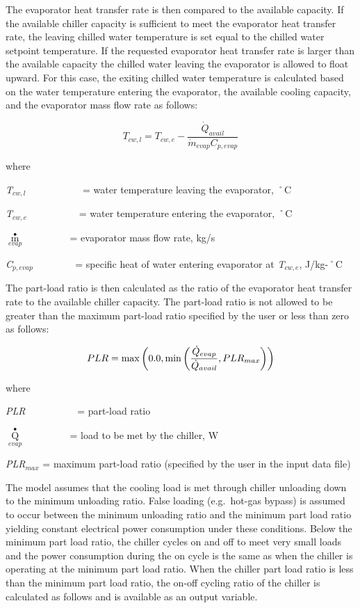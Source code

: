 The evaporator heat transfer rate is then compared to the available capacity. If the available chiller capacity is sufficient to meet the evaporator heat transfer rate, the leaving chilled water temperature is set equal to the chilled water setpoint temperature. If the requested evaporator heat transfer rate is larger than the available capacity the chilled water leaving the evaporator is allowed to float upward. For this case, the exiting chilled water temperature is calculated based on the water temperature entering the evaporator, the available cooling capacity, and the evaporator mass flow rate as follows:

\begin{equation}
  T_{cw,l} = T_{cw,e} - \frac{\dot{Q}_{avail}}{\dot{m}_{evap}C_{p,evap}}
\end{equation}

where

\emph{T\(_{cw,l}\)}~~~~~~~~~~~ = water temperature leaving the evaporator, ˚C

\emph{T\(_{cw,e}\)}~~~~~~~~~~ = water temperature entering the evaporator, ˚C

\({\mathop m\limits^ \bullet_{evap}}\) ~~~~~~~~ = evaporator mass flow rate, kg/s

\emph{C\(_{p,evap}\)}~~~~~~~~ = specific heat of water entering evaporator at \emph{T\(_{cw,e}\)}, J/kg-˚C

The part-load ratio is then calculated as the ratio of the evaporator heat transfer rate to the available chiller capacity. The part-load ratio is not allowed to be greater than the maximum part-load ratio specified by the user or less than zero as follows:

\begin{equation}
  PLR = \max\left(0.0,\min\left(\frac{\dot{Q}_{evap}}{\dot{Q}_{avail}},PLR_{max}\right)\right)
\end{equation}

where

\emph{PLR}~~~~~~~~~~ = part-load ratio

\({\mathop Q\limits^ \bullet_{evap}}\) ~~~~~~~~ = load to be met by the chiller, W

\emph{PLR\(_{max}\)} = maximum part-load ratio (specified by the user in the input data file)

The model assumes that the cooling load is met through chiller unloading down to the minimum unloading ratio. False loading (e.g.~hot-gas bypass) is assumed to occur between the minimum unloading ratio and the minimum part load ratio yielding constant electrical power consumption under these conditions. Below the minimum part load ratio, the chiller cycles on and off to meet very small loads and the power consumption during the on cycle is the same as when the chiller is operating at the minimum part load ratio. When the chiller part load ratio is less than the minimum part load ratio, the on-off cycling ratio of the chiller is calculated as follows and is available as an output variable.

